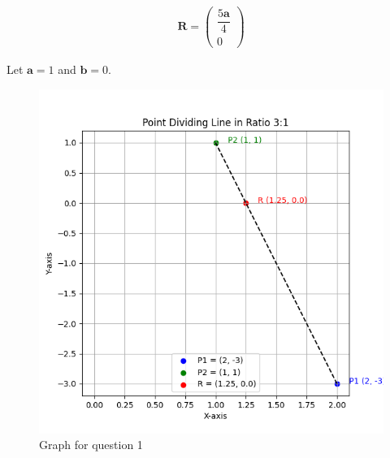 \documentclass[journal]{IEEEtran}
\renewcommand{\vec}[1]{\mathbf{#1}} %
\newcommand{\myvec}[1]{\begin{pmatrix}#1\end{pmatrix}}
\begin{document}
\begin{align}
\boxed{\vec{R} = \myvec{\dfrac{5\vec{a}}{4} \\ 0}}
\end{align}

Let $\vec{a}=1$ and $\vec{b}=0$.

\begin{figure}[ht!]
\centering
\includegraphics[height=0.5\textheight, keepaspectratio]{figs/q1.png}
\caption{Graph for question 1}
\end{figure}
\end{document}
